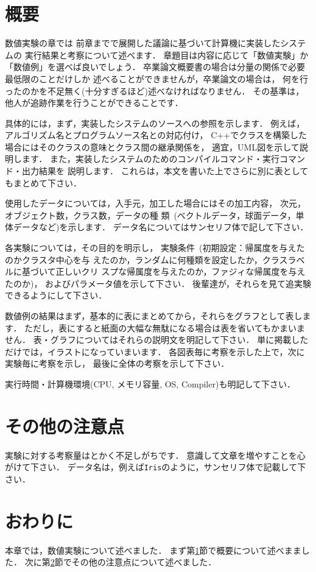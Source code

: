 \documentclass[a4j,12pt,dvipdfmx,oneside]{jsbook}
\theoremstyle{definition}
\begin{document}
\section{概要}\label{sec:experiment_abst}
%
%
%
数値実験の章では
前章までで展開した議論に基づいて計算機に実装したシステムの
実行結果と考察について述べます．
章題目は内容に応じて「数値実験」か「数値例」を選べば良いでしょう．
卒業論文概要書の場合は分量の関係で必要最低限のことだけしか
述べることができませんが，卒業論文の場合は，
何を行ったのかを不足無く(十分すぎるほど)述べなければなりません．
その基準は，他人が追跡作業を行うことができることです．

具体的には，まず，実装したシステムのソースへの参照を示します．
例えば，
アルゴリズム名とプログラムソース名との対応付け，
C++でクラスを構築した場合にはそのクラスの意味とクラス間の継承関係を，
適宜，UML図を示して説明します．
また，実装したシステムのためのコンパイルコマンド・実行コマンド・出力結果を
説明します．
これらは，本文を書いた上でさらに別に表としてもまとめて下さい．

使用したデータについては，入手元，加工した場合にはその加工内容，
次元，オブジェクト数，クラス数，データの種
類~(ベクトルデータ，球面データ，単体データなど)を示します．
データ名についてはサンセリフ体で記して下さい．

各実験については，その目的を明示し，
実験条件~(初期設定：帰属度を与えたのかクラスタ中心を与
えたのか，ランダムに何種類を設定したか，クラスラベルに基づいて正しいクリ
スプな帰属度を与えたのか，ファジィな帰属度を与えたのか)，
およびパラメータ値を示して下さい．
後輩達が，それらを見て追実験できるようにして下さい．

数値例の結果はまず，基本的に表にまとめてから，それらをグラフとして表します．
ただし，表にすると紙面の大幅な無駄になる場合は表を省いてもかまいません．
表・グラフについてはそれらの説明文を明記して下さい．
単に掲載しただけでは，イラストになっていまいます．
各図表毎に考察を示した上で，次に実験毎に考察を示し，
最後に全体の考察を示して下さい．

実行時間・計算機環境(CPU, メモリ容量, OS, Compiler)も明記して下さい．
%
%
%
\section{その他の注意点}\label{sec:experiment_remark}
%
%
%
実験に対する考察量はとかく不足しがちです．
意識して文章を増やすことを心がけて下さい．
データ名は，例えば\texttt{Iris}のように，サンセリフ体で記載して下さい．
%
%
%
\section{おわりに}\label{sec:experiment_summary}
本章では，数値実験について述べました．
まず第\ref{sec:experiment_abst}節で概要について述べまました．
次に第\ref{sec:experiment_remark}節でその他の注意点について述べました．
%
%
%
\end{document}
